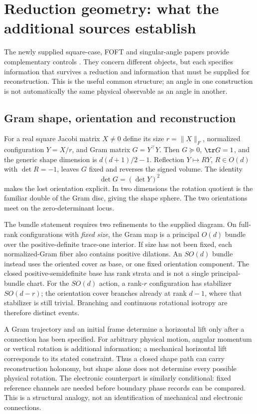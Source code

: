 \section{Reduction geometry: what the additional sources establish}
The newly supplied square-case, FOFT and singular-angle papers provide complementary controls \cite{ladder,foft,angle}. They concern different objects, but each specifies information that survives a reduction and information that must be supplied for reconstruction. This is the useful common structure; an angle in one construction is not automatically the same physical observable as an angle in another.

\subsection{Gram shape, orientation and reconstruction}
For a real square Jacobi matrix $X\ne0$ define its size $r=\|X\|_F$, normalized configuration $Y=X/r$, and Gram matrix $G=Y^\top Y$. Then $G\succeq0$, $\tr G=1$, and the generic shape dimension is $d(d+1)/2-1$. Reflection $Y\mapsto RY$, $R\in O(d)$ with $\det R=-1$, leaves $G$ fixed and reverses the signed volume. The identity
\begin{equation}
\det G=(\det Y)^2
\end{equation}
makes the lost orientation explicit. In two dimensions the rotation quotient is the familiar double of the Gram disc, giving the shape sphere. The two orientations meet on the zero-determinant locus.

The bundle statement requires two refinements to the supplied diagram. On full-rank configurations with \emph{fixed size}, the Gram map is a principal $O(d)$ bundle over the positive-definite trace-one interior. If size has not been fixed, each normalized-Gram fiber also contains positive dilations. An $SO(d)$ bundle instead uses the oriented cover as base, or one fixed orientation component. The closed positive-semidefinite base has rank strata and is not a single principal-bundle chart. For the $SO(d)$ action, a rank-$r$ configuration has stabilizer $SO(d-r)$; the orientation cover branches already at rank $d-1$, where that stabilizer is still trivial. Branching and continuous rotational isotropy are therefore distinct events.

A Gram trajectory and an initial frame determine a horizontal lift only after a connection has been specified. For arbitrary physical motion, angular momentum or vertical rotation is additional information; a mechanical horizontal lift corresponds to its stated constraint. Thus a closed shape path can carry reconstruction holonomy, but shape alone does not determine every possible physical rotation. The electronic counterpart is similarly conditional: fixed reference channels are needed before boundary phase records can be compared. This is a structural analogy, not an identification of mechanical and electronic connections.

